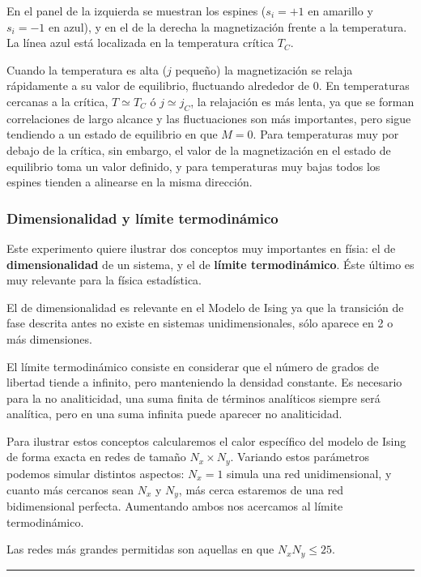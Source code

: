 \documentclass[11pt, a4paper]{article} %
\theoremstyle{named}
\begin{document}
En el panel de la izquierda se muestran los espines ($s_i = +1$ en amarillo y $s_i = -1$ en azul), y en el de la derecha la magnetización frente a la temperatura. La línea azul está localizada en la temperatura crítica $T_C$.

Cuando la temperatura es alta ($j$ pequeño) la magnetización se relaja rápidamente a su valor de equilibrio, fluctuando alrededor de $0$. En temperaturas cercanas a la crítica, $T \simeq T_C$ ó $j \simeq j_C$, la relajación es más lenta, ya que se forman correlaciones de largo alcance y las fluctuaciones son más importantes, pero sigue tendiendo a un estado de equilibrio en que $M=0$. Para temperaturas muy por debajo de la crítica, sin embargo, el valor de la magnetización en el estado de equilibrio toma un valor definido, y para temperaturas muy bajas todos los espines tienden a alinearse en la misma dirección.

\subsubsection{Dimensionalidad y límite termodinámico}\label{sec:lt}

Este experimento quiere ilustrar dos conceptos muy importantes en físia: el de \textbf{dimensionalidad} de un sistema, y el de \textbf{límite termodinámico}. Éste último es muy relevante para la física estadística.

El de dimensionalidad es relevante en el  Modelo de Ising ya que la transición de fase descrita antes no existe en sistemas unidimensionales, sólo aparece en 2 o más dimensiones.

El límite termodinámico consiste en considerar que el número de grados de libertad tiende a infinito, pero manteniendo la densidad constante.
Es necesario para la no analiticidad, una suma finita de términos analíticos siempre será analítica, pero en una suma infinita puede aparecer no analiticidad.

Para ilustrar  estos conceptos calcularemos el calor específico del modelo de Ising de forma exacta en redes de tamaño $N_x \times N_y$. Variando estos parámetros podemos simular distintos aspectos: $N_x=1$ simula una red unidimensional, y cuanto más cercanos sean $N_x$ y $N_y$, más cerca estaremos de una red bidimensional perfecta. Aumentando ambos nos acercamos al límite termodinámico.

Las redes más grandes permitidas son aquellas en que $N_x N_y \leq 25$.

\noindent\rule{\linewidth}{0.4pt}
\end{document}
